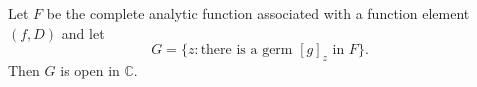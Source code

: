 Let $F$ be the complete analytic function associated with a function element $(f, D)$ and let
$$G = \{z : \text{there is a germ } [g]_z \text{ in } F\}.$$
Then $G$ is open in $\mathbb{C}$.

